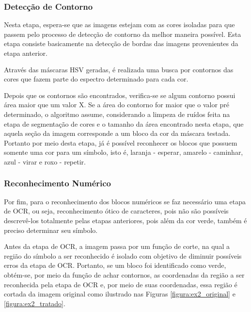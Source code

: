     \subsubsection{Detecção de Contorno}
    Nesta etapa, espera-se que as imagens estejam com as cores isoladas para que passem pelo processo de detecção de contorno da melhor maneira possível. Esta etapa consiste basicamente na detecção de bordas das imagens provenientes da etapa anterior.

    Através das máscaras HSV geradas, é realizada uma busca por contornos das cores que fazem parte do espectro determinado para cada cor.
    
    Depois que os contornos são encontrados, verifica-se se algum contorno possui área maior que um valor X. Se a área do contorno for maior que o valor pré determinado, o algoritmo assume, considerando a limpeza de ruídos feita na etapa de segmentação de cores e o tamanho da área encontrado nesta etapa, que aquela seção da imagem corresponde a um bloco da cor da máscara testada. Portanto por meio desta etapa, já é possível reconhecer os blocos que possuem somente uma cor para um símbolo, isto é, laranja - esperar, amarelo - caminhar, azul - virar e roxo - repetir.
    
    
    \subsubsection{Reconhecimento Numérico}
    Por fim, para o reconhecimento dos blocos numéricos se faz necessário uma etapa de OCR, ou seja, reconhecimento ótico de caracteres, pois não são possíveis descrevê-los totalmente pelas etapas anteriores, pois além da cor verde, também é preciso determinar seu símbolo.
    
    Antes da etapa de OCR, a imagem passa por um função de corte, na qual a região do símbolo a ser reconhecido é isolado com objetivo de diminuir possíveis erros da etapa de OCR. Portanto, se um bloco foi identificado como verde, obtém-se, por meio da função de achar contornos,  as coordenadas da região a ser reconhecida pela etapa de OCR e, por meio de suas coordenadas, essa região é cortada da imagem original como ilustrado nas Figuras \ref{figura:ex2_original} e \ref{figura:ex2_tratado}.
    
